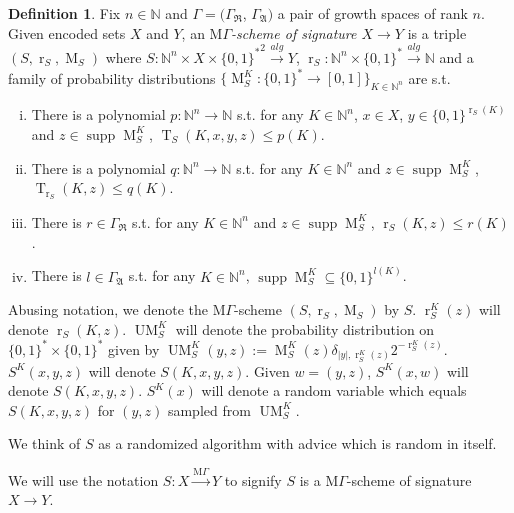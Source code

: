 \documentclass{article}
\numberwithin{equation}{section}
\theoremstyle{definition}
\newtheorem{definition}{Definition}[section]
\theoremstyle{plain}
\newcommand{\Words}{{\{ 0, 1 \}^*}}
\newcommand{\WordsLen}[1]{{\{ 0, 1 \}^{#1}}}
\DeclareMathOperator{\Supp}{supp}
\DeclareMathOperator{\T}{T}
\DeclareMathOperator{\R}{r}
\DeclareMathOperator{\M}{M}
\DeclareMathOperator{\UM}{UM}
\newcommand{\Nats}{\mathbb{N}}
\newcommand{\Abs}[1]{\lvert #1 \rvert}
\begin{document}
\begin{definition}

Fix $n \in \Nats$ and $\Gamma=(\Gamma_{\mathfrak{R}}$, $\Gamma_{\mathfrak{A}})$ a pair of growth spaces of rank $n$. Given encoded sets $X$ and $Y$, an \emph{$\mathrm{M}\Gamma$-scheme of signature $X \rightarrow Y$} is a triple $(S,\R_S,\M_S)$ where $S: \Nats^n \times X \times \Words^2 \xrightarrow{alg} Y$, $\R_S: \Nats^n \times \Words \xrightarrow{alg} \Nats$ and a family of probability distributions $\{\M_S^K: \Words \rightarrow [0,1]\}_{K \in \Nats^n}$ are s.t.

\begin{enumerate}[(i)]

\item There is a polynomial $p: \Nats^n \rightarrow \Nats$ s.t. for any $K \in \Nats^n$, $x \in X$, ${y \in \WordsLen{\R_S(K)}}$ and $z \in \Supp \M_S^K$, $\T_S(K,x,y,z) \leq p(K)$.

\item There is a polynomial $q: \Nats^n \rightarrow \Nats$ s.t. for any $K \in \Nats^n$ and $z \in \Supp \M_S^K$, ${\T_{\R_S}(K,z) \leq q(K)}$.

\item There is $r \in \Gamma_{\mathfrak{R}}$ s.t. for any $K \in \Nats^n$ and $z \in \Supp \M_S^K$, $\R_S(K,z) \leq r(K)$.

\item There is $l \in \Gamma_{\mathfrak{A}}$ s.t. for any $K \in \Nats^n$, $\Supp \M_S^K \subseteq \WordsLen{l(K)}$.

\end{enumerate}

Abusing notation, we denote the $\mathrm{M}\Gamma$-scheme $(S,\R_S,\M_S)$ by $S$. $\R_S^K(z)$ will denote $\R_S(K,z)$. $\UM_S^K$ will denote the probability distribution on ${\Words \times \Words}$ given by $\UM_S^K(y,z):= \M_S^K(z) \delta_{\Abs{y},\R_S^K(z)} 2^{-\R_S^K(z)}$. $S^K(x,y,z)$ will denote $S(K,x,y,z)$. Given $w=(y,z)$, $S^K(x,w)$ will denote $S(K,x,y,z)$. $S^K(x)$ will denote a random variable which equals $S(K,x,y,z)$ for $(y,z)$ sampled from $\UM_S^K$. 

We think of $S$ as a randomized algorithm with advice which is random in itself.

We will use the notation $S: X \xrightarrow{\mathrm{M}\Gamma} Y$ to signify $S$ is a $\mathrm{M}\Gamma$-scheme of signature $X \rightarrow Y$.

\end{definition}
\end{document}

